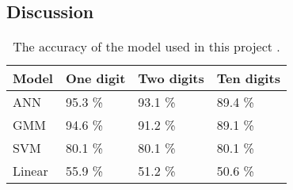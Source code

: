 \subsection*{Discussion}


\begin{table}[h]
\begin{tabular}{@{}l|lll@{}}
\toprule
Model 		   		   & One digit            & Two digits  & Ten digits   \\ \midrule
ANN                    & 95.3 \%                & 93.1 \% & 89.4 \% \\
GMM                    & 94.6 \%                & 91.2 \% & 89.1 \% \\
SVM                    & 80.1 \%                & 80.1 \% & 80.1 \% \\ 
Linear                 & 55.9 \% 				& 51.2 \% & 50.6 \%
\end{tabular}
\caption{The accuracy of the model used in this project .}
\label{table:result}
\end{table}